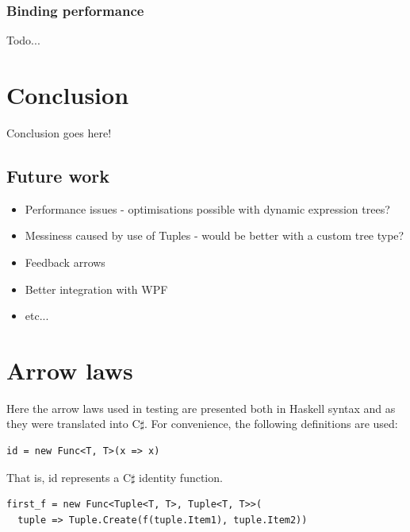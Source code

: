 \documentclass[12pt,twoside,notitlepage]{report}
\begin{document}
\subsection{Binding performance}

Todo...

\cleardoublepage



\chapter{Conclusion}

Conclusion goes here!

\section{Future work}

\begin{itemize}
	\item Performance issues - optimisations possible with dynamic expression trees?
	\item Messiness caused by use of Tuples - would be better with a custom tree type?
	\item Feedback arrows
	\item Better integration with WPF
	\item etc...
\end{itemize}

\cleardoublepage



\appendix

\chapter{Arrow laws} \label{sec:arrow_laws}

Here the arrow laws used in testing are presented both in Haskell syntax and as they were translated into C$\sharp$. For convenience, the following definitions are used:

\begin{lstlisting}
id = new Func<T, T>(x => x)
\end{lstlisting}

That is, id represents a C$\sharp$ identity function.

\begin{lstlisting}
first_f = new Func<Tuple<T, T>, Tuple<T, T>>(
  tuple => Tuple.Create(f(tuple.Item1), tuple.Item2))
\end{lstlisting}
\end{document}
